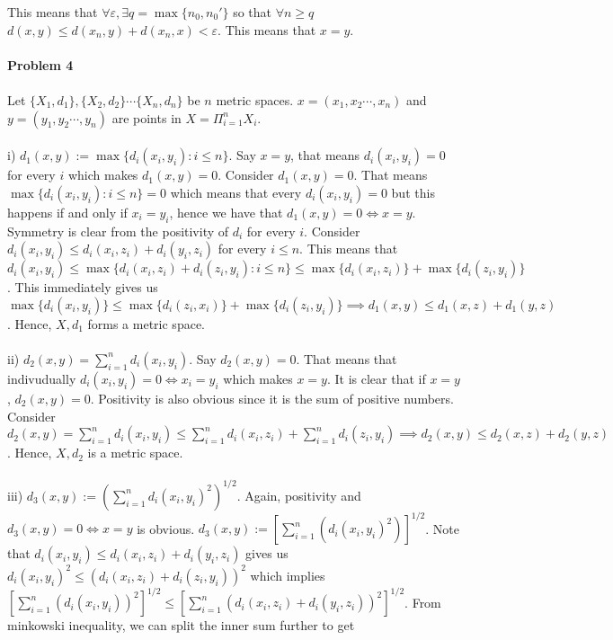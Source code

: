 \documentclass[../Main.tex]{subfiles}
\begin{document}
This means that $\forall \varepsilon, \exists q=\max\{n_0,n_0'\}$ so that $\forall n \geq q$ $d(x,y) \leq d(x_n,y)+d(x_n,x)<\varepsilon$. This means that $x=y$. 
\\\\ \textbf{Problem 4}
\\\\ Let $\{X_1,d_1\},\{X_2,d_2\} \cdots \{X_n,d_n\}$ be $n$ metric spaces. $x=(x_1,x_2 \cdots ,x_n)$ and $y=(y_1,y_2 \cdots, y_n)$ are points in $X=\Pi_{i=1}^n X_i$. 
\\\\ i) $d_1(x,y):=\max\{d_i(x_i,y_i): i \leq n\}$. Say $x=y$, that means $d_i(x_i,y_i)=0$ for every $i$ which makes $d_1(x,y)=0$. Consider $d_1(x,y)=0$. That means $\max\{d_i(x_i,y_i): i \leq n\}=0$ which means that every $d_i(x_i,y_i)=0$ but this happens if and only if $x_i=y_i$, hence we have that $d_1(x,y)=0 \iff x=y$. Symmetry is clear from the positivity of $d_i$ for every $i$.
Consider $d_i(x_i,y_i)\leq d_i(x_i,z_i)+d_i(y_i,z_i)$ for every $i \leq n$. This means that $d_i(x_i,y_i) \leq \max\{d_i(x_i,z_i)+d_i(z_i,y_i): i \leq n\} \leq \max\{d_i(x_i,z_i)\}+\max\{d_i(z_i,y_i)\}$. This immediately gives us $\max\{d_i(x_i,y_i)\}\leq \max\{d_i(z_i,x_i)\}+\max\{d_i(z_i,y_i)\} \implies d_1(x,y)\leq d_1(x,z)+d_1(y,z)$. Hence, $X,d_1$ forms a metric space.
\\\\ ii) $d_2(x,y)=\sum_{i=1}^n d_i(x_i,y_i)$. Say $d_2(x,y)=0$. That means that indivudually $d_i(x_i,y_i)=0 \iff x_i=y_i$ which makes $x=y$. It is clear that if $x=y$, $d_2(x,y)=0$. Positivity is also obvious since it is the sum of positive numbers. Consider $d_2(x,y)=\sum_{i=1}^n d_i(x_i,y_i) \leq \sum_{i=1}^n d_i(x_i,z_i)+ \sum_{i=1}^n d_i(z_i,y_i) \implies d_2(x,y) \leq d_2(x,z)+d_2(y,z)$. Hence, $X,d_2$ is a metric space.
\\\\ iii) $d_3(x,y):= (\sum_{i=1}^n d_i(x_i,y_i)^2)^{1/2}$. Again, positivity and $d_3(x,y)=0 \iff x=y$ is obvious. $d_3(x,y):=[\sum_{i=1}^n (d_i(x_i,y_i)^2)]^{1/2}$. Note that $d_i(x_i,y_i)\leq d_i(x_i,z_i)+d_i(y_i,z_i)$ gives us $d_i(x_i,y_i)^2 \leq (d_i(x_i,z_i)+d_i(z_i,y_i))^2$ which implies $[\sum_{i=1}^n(d_i(x_i,y_i))^2]^{1/2}\leq [\sum_{i=1}^n (d_i(x_i,z_i)+d_i(y_i,z_i))^2]^{1/2}$. From minkowski inequality, we can split the inner sum further to get 
\end{document}
